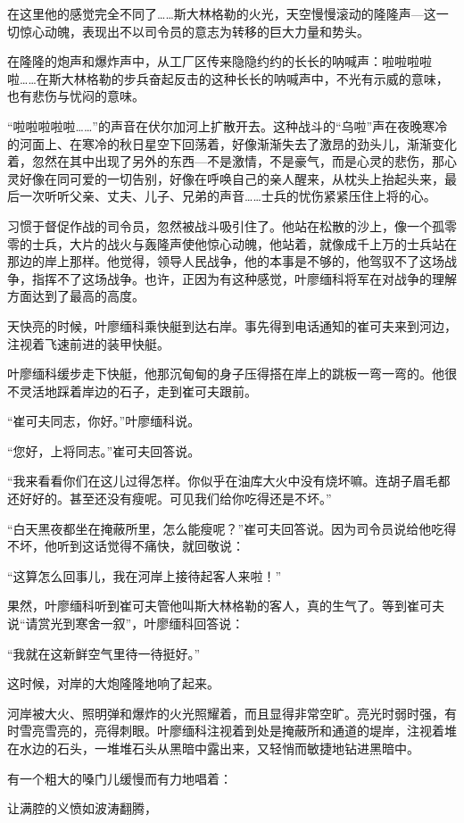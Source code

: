 在这里他的感觉完全不同了……斯大林格勒的火光，天空慢慢滚动的隆隆声—这一切惊心动魄，表现出不以司令员的意志为转移的巨大力量和势头。

在隆隆的炮声和爆炸声中，从工厂区传来隐隐约约的长长的呐喊声：啦啦啦啦啦……在斯大林格勒的步兵奋起反击的这种长长的呐喊声中，不光有示威的意味，也有悲伤与忧闷的意味。

“啦啦啦啦啦……”的声音在伏尔加河上扩散开去。这种战斗的“乌啦”声在夜晚寒冷的河面上、在寒冷的秋日星空下回荡着，好像渐渐失去了激昂的劲头儿，渐渐变化着，忽然在其中出现了另外的东西—不是激情，不是豪气，而是心灵的悲伤，那心灵好像在同可爱的一切告别，好像在呼唤自己的亲人醒来，从枕头上抬起头来，最后一次听听父亲、丈夫、儿子、兄弟的声音……士兵的忧伤紧紧压住上将的心。

习惯于督促作战的司令员，忽然被战斗吸引住了。他站在松散的沙上，像一个孤零零的士兵，大片的战火与轰隆声使他惊心动魄，他站着，就像成千上万的士兵站在那边的岸上那样。他觉得，领导人民战争，他的本事是不够的，他驾驭不了这场战争，指挥不了这场战争。也许，正因为有这种感觉，叶廖缅科将军在对战争的理解方面达到了最高的高度。

天快亮的时候，叶廖缅科乘快艇到达右岸。事先得到电话通知的崔可夫来到河边，注视着飞速前进的装甲快艇。

叶廖缅科缓步走下快艇，他那沉甸甸的身子压得搭在岸上的跳板一弯一弯的。他很不灵活地踩着岸边的石子，走到崔可夫跟前。

“崔可夫同志，你好。”叶廖缅科说。

“您好，上将同志。”崔可夫回答说。

“我来看看你们在这儿过得怎样。你似乎在油库大火中没有烧坏嘛。连胡子眉毛都还好好的。甚至还没有瘦呢。可见我们给你吃得还是不坏。”

“白天黑夜都坐在掩蔽所里，怎么能瘦呢？”崔可夫回答说。因为司令员说给他吃得不坏，他听到这话觉得不痛快，就回敬说：

“这算怎么回事儿，我在河岸上接待起客人来啦！”

果然，叶廖缅科听到崔可夫管他叫斯大林格勒的客人，真的生气了。等到崔可夫说“请赏光到寒舍一叙”，叶廖缅科回答说：

“我就在这新鲜空气里待一待挺好。”

这时候，对岸的大炮隆隆地响了起来。

河岸被大火、照明弹和爆炸的火光照耀着，而且显得非常空旷。亮光时弱时强，有时雪亮雪亮的，亮得刺眼。叶廖缅科注视着到处是掩蔽所和通道的堤岸，注视着堆在水边的石头，一堆堆石头从黑暗中露出来，又轻悄而敏捷地钻进黑暗中。

有一个粗大的嗓门儿缓慢而有力地唱着：

让满腔的义愤如波涛翻腾，

